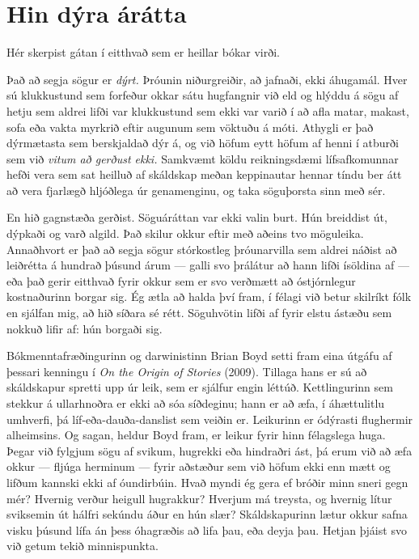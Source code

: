 \section*{Hin dýra árátta}

Hér skerpist gátan í eitthvað sem er heillar bókar virði.

Það að segja sögur er \emph{dýrt.} Þróunin niðurgreiðir, að jafnaði, ekki áhugamál. Hver sú klukkustund sem forfeður okkar sátu hugfangnir við eld og hlýddu á sögu af hetju sem aldrei lifði var klukkustund sem ekki var varið í að afla matar, makast, sofa eða vakta myrkrið eftir augunum sem vöktuðu á móti. Athygli er það dýrmætasta sem berskjaldað dýr á, og við höfum eytt höfum af henni í atburði sem við \emph{vitum að gerðust ekki.} Samkvæmt köldu reikningsdæmi lífsafkomunnar hefði vera sem sat heilluð af skáldskap meðan keppinautar hennar tíndu ber átt að vera fjarlægð hljóðlega úr genamenginu, og taka söguþorsta sinn með sér.

En hið gagnstæða gerðist. Söguáráttan var ekki valin burt. Hún breiddist út, dýpkaði og varð algild. Það skilur okkur eftir með aðeins tvo möguleika. Annaðhvort er það að segja sögur stórkostleg þróunarvilla sem aldrei náðist að leiðrétta á hundrað þúsund árum — galli svo þrálátur að hann lifði ísöldina af — eða það gerir eitthvað fyrir okkur sem er svo verðmætt að óstjórnlegur kostnaðurinn borgar sig. Ég ætla að halda því fram, í félagi við betur skilríkt fólk en sjálfan mig, að hið síðara sé rétt. Söguhvötin lifði af fyrir elstu ástæðu sem nokkuð lifir af: hún borgaði sig.

Bókmenntafræðingurinn og darwinistinn Brian Boyd setti fram eina útgáfu af þessari kenningu í \emph{On the Origin of Stories} (2009). Tillaga hans er sú að skáldskapur spretti upp úr leik, sem er sjálfur engin léttúð. Kettlingurinn sem stekkur á ullarhnoðra er ekki að sóa síðdeginu; hann er að æfa, í áhættulitlu umhverfi, þá líf-eða-dauða-danslist sem veiðin er. Leikurinn er ódýrasti flughermir alheimsins. Og sagan, heldur Boyd fram, er leikur fyrir hinn félagslega huga. Þegar við fylgjum sögu af svikum, hugrekki eða hindraðri ást, þá erum við að æfa okkur — fljúga herminum — fyrir aðstæður sem við höfum ekki enn mætt og lifðum kannski ekki af óundirbúin. Hvað myndi ég gera ef bróðir minn sneri gegn mér? Hvernig verður heigull hugrakkur? Hverjum má treysta, og hvernig lítur sviksemin út hálfri sekúndu áður en hún slær? Skáldskapurinn lætur okkur safna visku þúsund lífa án þess óhagræðis að lifa þau, eða deyja þau. Hetjan þjáist svo við getum tekið minnispunkta.

